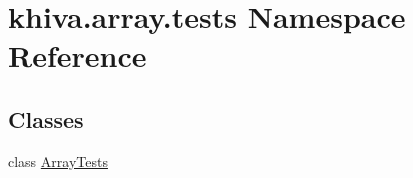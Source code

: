 \hypertarget{namespacekhiva_1_1array_1_1tests}{}\section{khiva.\+array.\+tests Namespace Reference}
\label{namespacekhiva_1_1array_1_1tests}
\subsection*{Classes}
\begin{DoxyCompactItemize}
\item 
class \mbox{\hyperlink{classkhiva_1_1array_1_1tests_1_1_array_tests}{Array\+Tests}}
\end{DoxyCompactItemize}
